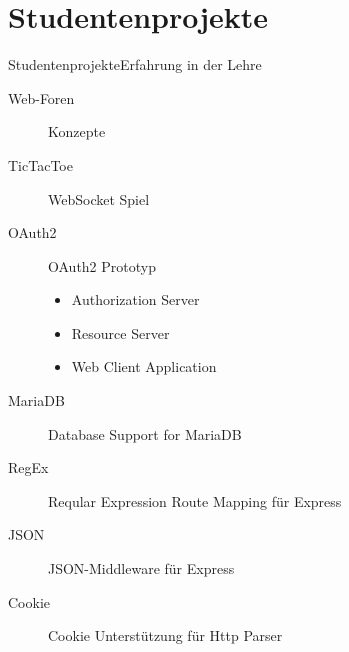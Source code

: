 ﻿\part{Studentenprojekte}

\begin{frame}{Studentenprojekte}{Erfahrung in der Lehre}
  \begin{description}
    \item [Web-Foren] Konzepte
    \item [TicTacToe] WebSocket Spiel \href{https://github.com/hierischmarkus/tiktaktoe}{}
    \item [OAuth2] OAuth2 Prototyp \href{https://github.com/VolkerChristian/snode.c/pull/17}{}
    \begin{itemize}
      \item Authorization Server
      \item Resource Server
      \item Web Client Application
    \end{itemize}
    \item [MariaDB] Database Support for MariaDB \href{https://github.com/VolkerChristian/snode.c/pull/14}{}
    \item [RegEx] Reqular Expression Route Mapping für Express \href{https://github.com/VolkerChristian/snode.c/pull/10}{}
    \item [JSON] JSON-Middleware für Express \href{https://github.com/VolkerChristian/snode.c/pull/12}{}
    \item [Cookie] Cookie Unterstützung für Http Parser \href{https://github.com/VolkerChristian/snode.c/pull/2}{}
  \end{description}
\end{frame}
